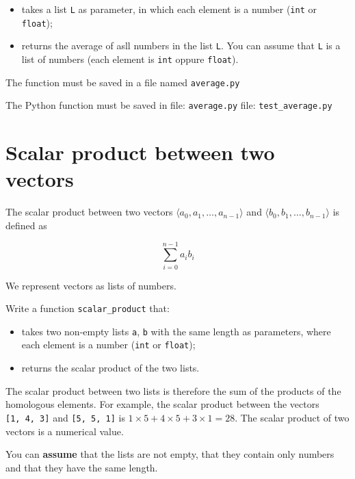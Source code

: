 \begin{itemize}
\tightlist
\item
  takes a list \texttt{L} as parameter, in which each element is a
  number (\texttt{int} or \texttt{float});
\item
  returns the average of asll numbers in the list \texttt{L}. You can
  assume that \texttt{L} is a list of numbers (each element is
  \texttt{int} oppure \texttt{float}).
\end{itemize}

The function must be saved in a file named \texttt{average.py}

The Python function must be saved in file: \texttt{average.py}
\Test file: \texttt{test\_average.py}

\pagebreak

\section{Scalar product between two
vectors}\label{scalar-product-between-two-vectors}

The scalar product between two vectors
\(\langle a_0, a_1,\ldots, a_{n-1}  \rangle\) and
\(\langle b_0,b_1,\ldots, b_{n-1} \rangle\) is defined as

\begin{equation*}
      \sum_{i=0}^{n-1} a_i b_i
\end{equation*}

We represent vectors as lists of numbers.

Write a function \texttt{scalar\_product} that:

\begin{itemize}
\item
  takes two non-empty lists \texttt{a}, \texttt{b} with the same length
  as parameters, where each element is a number (\texttt{int} or
  \texttt{float});
\item
  returns the scalar product of the two lists.
\end{itemize}

The scalar product between two lists is therefore the sum of the
products of the homologous elements. For example, the scalar product
between the vectors \texttt{{[}1,\ 4,\ 3{]}} and
\texttt{{[}5,\ 5,\ 1{]}} is
\(1 \times 5 + 4 \times 5 + 3 \times 1 = 28\). The scalar product of two
vectors is a numerical value.

You can \textbf{assume} that the lists are not empty, that they contain
only numbers and that they have the same length.

